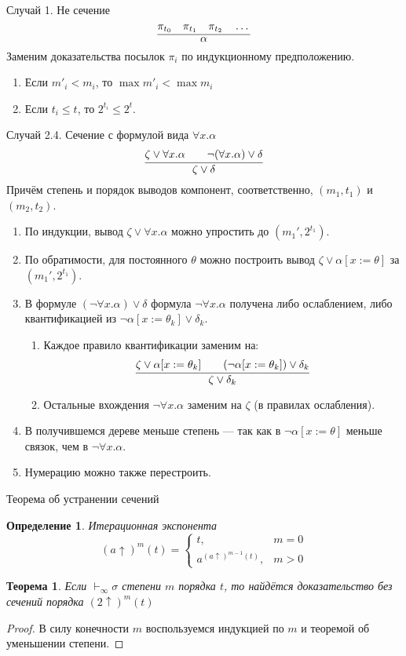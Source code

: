 \documentclass[aspectratio=169]{beamer}
\newtheorem{thm}{Теорема}[section]
\newtheorem{dfn}{Определение}[section]
\begin{document}
\begin{frame}{Случай 1. Не сечение}
$$\infer{\alpha}{\pi_{t_0}\quad\pi_{t_1}\quad\pi_{t_2}\quad\dots}$$
Заменим доказательства посылок $\pi_i$ по индукционному предположению.

\begin{enumerate}
\item Если $m'_i < m_i$, то $\max m'_i < \max m_i$
\item Если $t_i \le t$, то $2^{t_i} \le 2^t$.
\end{enumerate}
\end{frame}

\begin{frame}{Случай 2.4. Сечение с формулой вида $\forall x.\alpha$}
$$\infer{\zeta\vee\delta}{\zeta\vee\forall x.\alpha\quad\quad\neg(\forall x.\alpha)\vee\delta}$$
Причём степень и порядок выводов компонент, соответственно, $(m_1,t_1)$ и $(m_2,t_2)$.
\begin{enumerate}
\item По индукции, вывод $\zeta\vee\forall x.\alpha$ можно упростить до $(m_1',2^{t_1})$.
\item По обратимости, для постоянного $\theta$ можно построить вывод $\zeta\vee\alpha[x := \theta]$ за $(m_1',2^{t_1})$.
\item В формуле $(\neg \forall x. \alpha)\vee\delta$ формула $\neg\forall x.\alpha$ получена
либо ослаблением, либо квантификацией из $\neg\alpha[x := \theta_k]\vee\delta_k$. 
\begin{enumerate}
\item Каждое правило квантификации заменим на:
$$\infer{\zeta\vee\delta_k}{\zeta\vee\alpha[x := \theta_k]\quad\quad(\neg\alpha[x := \theta_k])\vee\delta_k}$$
\item Остальные вхождения $\neg\forall x.\alpha$ заменим на $\zeta$ (в правилах ослабления).
\end{enumerate}
\item В получившемся дереве меньше степень --- так как в $\neg\alpha[x := \theta]$ меньше связок, чем в $\neg\forall x.\alpha$.
\item Нумерацию можно также перестроить.
\end{enumerate}
\end{frame}

\begin{frame}{Теорема об устранении сечений}
\begin{dfn}Итерационная экспонента
$$(a\uparrow)^m(t) = 
  \left\{
    \begin{array}{ll}     t,&m=0\\
                          a^{(a\uparrow)^{m-1}(t)},&m > 0
    \end{array}
  \right.
$$
\end{dfn}
\begin{thm}Если $\vdash_\infty\sigma$ степени $m$ порядка $t$, то найдётся доказательство без сечений
порядка $(2\uparrow)^m(t)$
\end{thm}
\begin{proof}
В силу конечности $m$ воспользуемся индукцией по $m$ и теоремой об уменьшении степени.
\end{proof}
\end{frame}
\end{document}
